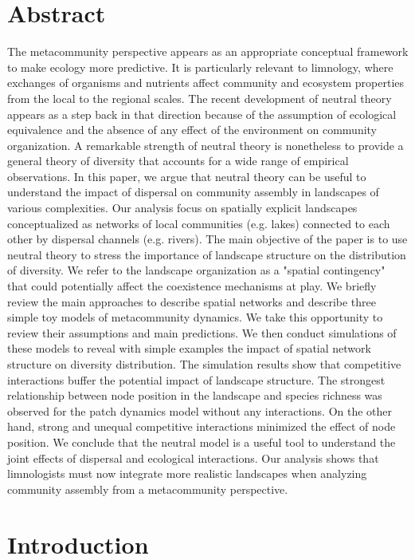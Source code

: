 \documentclass[12pt]{article}
\begin{document}
\section*{Abstract} 
The metacommunity perspective appears as an appropriate conceptual framework to
make ecology more predictive. It is particularly relevant to limnology, where
exchanges of organisms and nutrients affect community and ecosystem properties
from the local to the regional scales. The recent development of neutral theory
appears as a step back in that direction because of the assumption of ecological
equivalence and the absence of any effect of the environment on community
organization. A remarkable strength of neutral theory is nonetheless to provide
a general theory of diversity that accounts for a wide range of empirical
observations. In this paper, we argue that neutral theory can be useful to
understand the impact of dispersal on community assembly in landscapes of
various complexities. Our analysis focus on spatially explicit landscapes
conceptualized as networks of local communities (e.g. lakes) connected to each
other by dispersal channels (e.g. rivers). The main objective of the paper is to
use neutral theory to stress the importance of landscape structure on the
distribution of diversity. We refer to the landscape organization as a "spatial
contingency" that could potentially affect the coexistence mechanisms at play.
We briefly review the main approaches to describe spatial networks and describe
three simple toy models of metacommunity dynamics. We take this opportunity to
review their assumptions and main predictions. We then conduct simulations of
these models to reveal with simple examples the impact of spatial network
structure on diversity distribution. The simulation results show that
competitive interactions buffer the potential impact of landscape structure. The
strongest relationship between node position in the landscape and species
richness was observed for the patch dynamics model without any
interactions. On the other hand, strong and unequal competitive interactions
minimized the effect of node position. We conclude that the neutral model is a
useful tool to understand the joint effects of dispersal and ecological
interactions. Our analysis shows that limnologists must now integrate more
realistic landscapes when analyzing community assembly from a metacommunity
perspective.
\newpage

\section*{Introduction}
\end{document}
